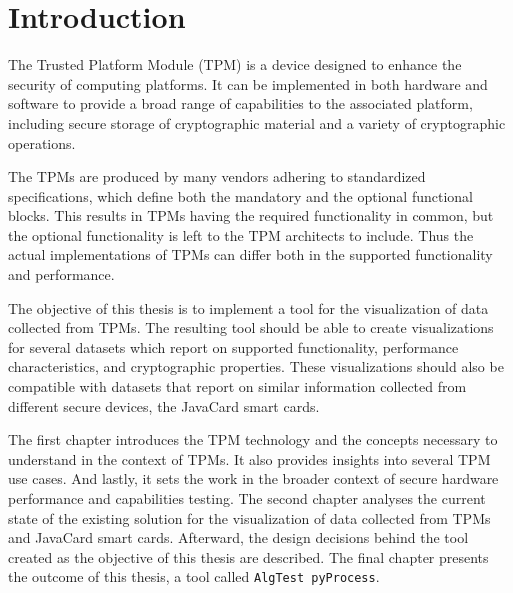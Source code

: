 \chapter{Introduction}
The Trusted Platform Module (TPM) is a device designed to enhance the security of computing platforms. It can be implemented in both hardware and software to provide a broad range of capabilities to the associated platform, including secure storage of cryptographic material and a variety of cryptographic operations.

The TPMs are produced by many vendors adhering to standardized specifications, which define both the mandatory and the optional functional blocks. This results in TPMs having the required functionality in common, but the optional functionality is left to the TPM architects to include. Thus the actual implementations of TPMs can differ both in the supported functionality and performance.

The objective of this thesis is to implement a tool for the visualization of data collected from TPMs. The resulting tool should be able to create visualizations for several datasets which report on supported functionality, performance characteristics, and cryptographic properties. These visualizations should also be compatible with datasets that report on similar information collected from different secure devices, the JavaCard smart cards.

The first chapter introduces the TPM technology and the concepts necessary to understand in the context of TPMs. It also provides insights into several TPM use cases. And lastly, it sets the work in the broader context of secure hardware performance and capabilities testing. The second chapter analyses the current state of the existing solution for the visualization of data collected from TPMs and JavaCard smart cards. Afterward, the design decisions behind the tool created as the objective of this thesis are described. The final chapter presents the outcome of this thesis, a tool called \texttt{AlgTest pyProcess}.
